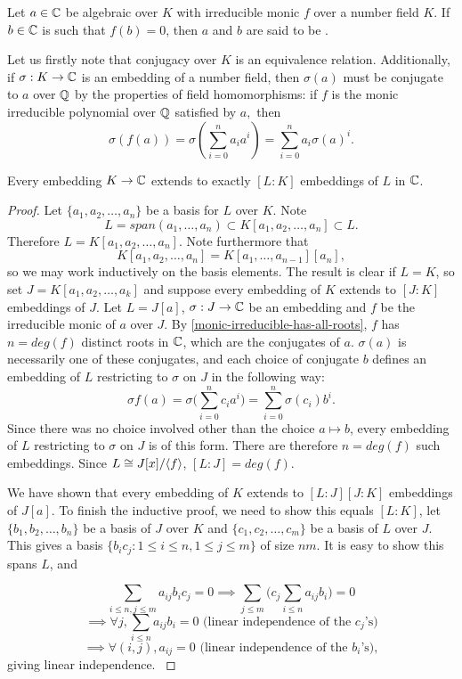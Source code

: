 \begin{definition}
Let $a\in \mathbb{C}$ be algebraic over $K$ with irreducible monic $f$ over a number field $K$. If $b\in \mathbb{C}$ is such that $f(b)=0$, then $a$ and $b$ are said to be .
\end{definition}

Let us firstly note that conjugacy over $K$ is an equivalence relation. Additionally, if $\sigma:K\rightarrow \mathbb{C}$ is an embedding of a number field, then $\sigma(a)$ must be conjugate to $a$ over $\mathbb{Q}$ by the properties of field homomorphisms: if $f$ is the monic irreducible polynomial over $\mathbb{Q}$ satisfied by $a,$ then
$$\sigma(f(a))=\sigma(\sum_{i=0}^n a_i a^i)=\sum_{i=0}^n a_i \sigma(a)^i.$$

\begin{proposition}\label{extend-to-[L:K]-embeddings}
Every embedding $K\rightarrow \mathbb{C}$ extends to exactly $[L:K]$ embeddings of $L$ in $\mathbb{C}$.
\end{proposition}
\begin{proof}
Let $\{a_1,a_2,\dots,a_n\}$ be a basis for $L$ over $K$. Note $$L=span(a_1,\dots,a_n)\subset K[a_1,a_2,\dots,a_n]\subset L.$$ Therefore $L= K[a_1,a_2,\dots,a_n].$ Note furthermore that $$K[a_1,a_2,\dots,a_n]=K[a_1,\dots,a_{n-1}][a_n],$$ so we may work inductively on the basis elements. The result is clear if $L=K$, so set $J=K[a_1,a_2,\dots,a_{k}]$ and suppose every embedding of $K$ extends to $[J:K]$ embeddings of $J$. Let $L=J[a]$, $\sigma:J\rightarrow \mathbb{C}$ be an embedding
and $f$ be the irreducible monic of $a$ over $J$. By \cref{monic-irreducible-has-all-roots}, $f$ has $n=deg(f)$ distinct roots in $\mathbb{C}$, which are the conjugates of $a.$ $\sigma(a)$ is necessarily one of these conjugates, and each choice of conjugate $b$ defines an embedding of $L$ restricting to $\sigma$ on $J$ in the following way:
$$\sigma f(a)=\sigma \big(\sum_{i=0}^n c_ia^i\big)=\sum_{i=0}^n \sigma(c_i) b^i.$$
Since there was no choice involved other than the choice $a\mapsto b$, every embedding of $L$ restricting to $\sigma$ on $J$ is of this form. There are therefore $n=deg(f)$ such embeddings. Since $L\cong J[x]/\langle f\rangle$, $[L:J]=deg(f)$. 

We have shown that every embedding of $K$ extends to $[L:J][J:K]$ embeddings of $J[a]$. To finish the inductive proof, we need to show this equals $[L:K]$, let $\{b_1,b_2,\dots,b_n\}$ be a basis of $J$ over $K$ and $\{c_1,c_2,\dots,c_m\}$ be a basis of $L$ over $J$. This gives a basis $\{b_ic_j:1\leq i \leq n, 1 \leq j\leq m\}$ of size $nm$. It is easy to show this spans $L$, and 

$$\sum_{i\leq n,j\leq m}a_{ij}b_ic_j=0\implies \sum_{j\leq m} \big(c_j \sum_{i\leq n}a_{ij}b_i\big)=0$$
$$\implies \forall j, \sum_{i\leq n} a_{ij}b_i=0 \text{ (linear independence of the } c_j \text{'s)}$$
$$\implies \forall (i,j), a_{ij}=0 \text{ (linear independence of the } b_i \text{'s)},$$
giving linear independence.  \cite{NumberFields}
\end{proof}

